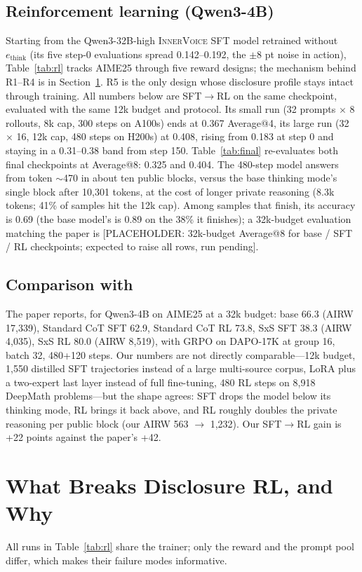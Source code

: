 \documentclass[letterpaper]{article} %
\newcommand{\placeholder}[1]{{\color{red}[PLACEHOLDER: #1]}}
\newcommand{\iv}{\textsc{InnerVoice}}
\begin{document}
\subsection{Reinforcement learning (Qwen3-4B)}\label{sec:rlres}

Starting from the Qwen3-32B-high \iv{} SFT model retrained without $e_{\text{think}}$ (its five step-0 evaluations spread 0.142--0.192, the $\pm$8 pt noise in action), Table~\ref{tab:rl} tracks AIME25 through five reward designs; the mechanism behind R1--R4 is in Section~\ref{sec:failures}. R5 is the only design whose disclosure profile stays intact through training. All numbers below are SFT$\rightarrow$RL on the same checkpoint, evaluated with the same 12k budget and protocol. Its small run (32 prompts $\times$ 8 rollouts, 8k cap, 300 steps on A100s) ends at 0.367 Average@4, its large run (32 $\times$ 16, 12k cap, 480 steps on H200s) at 0.408, rising from 0.183 at step 0 and staying in a 0.31--0.38 band from step 150. Table~\ref{tab:final} re-evaluates both final checkpoints at Average@8: 0.325 and 0.404. The 480-step model answers from token $\sim$470 in about ten public blocks, versus the base thinking mode's single block after 10,301 tokens, at the cost of longer private reasoning (8.3k tokens; 41\% of samples hit the 12k cap). Among samples that finish, its accuracy is 0.69 (the base model's is 0.89 on the 38\% it finishes); a 32k-budget evaluation matching the paper is \placeholder{32k-budget Average@8 for base / SFT / RL checkpoints; expected to raise all rows, run pending}.


\subsection{Comparison with \citet{wei2026sxs}}
The paper reports, for Qwen3-4B on AIME25 at a 32k budget: base 66.3 (AIRW 17,339), Standard CoT SFT 62.9, Standard CoT RL 73.8, SxS SFT 38.3 (AIRW 4,035), SxS RL 80.0 (AIRW 8,519), with GRPO on DAPO-17K at group 16, batch 32, 480+120 steps. Our numbers are not directly comparable---12k budget, 1,550 distilled SFT trajectories instead of a large multi-source corpus, LoRA plus a two-expert last layer instead of full fine-tuning, 480 RL steps on 8,918 DeepMath problems---but the shape agrees: SFT drops the model below its thinking mode, RL brings it back above, and RL roughly doubles the private reasoning per public block (our AIRW 563 $\to$ 1,232). Our SFT$\to$RL gain is +22 points against the paper's +42.

\section{What Breaks Disclosure RL, and Why}\label{sec:failures}
All runs in Table~\ref{tab:rl} share the trainer; only the reward and the prompt pool differ, which makes their failure modes informative.
\end{document}
